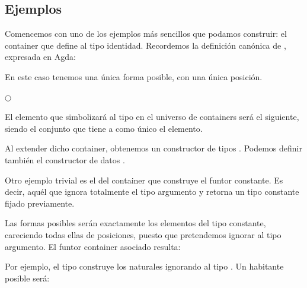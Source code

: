 \subsection{Ejemplos}


\begin{example}
  Comencemos con uno de los ejemplos más sencillos que podamos construir: el container que define al tipo identidad.
  Recordemos la definición canónica de , expresada en Agda:

  
  En este caso tenemos una única forma posible, con una única posición.

\begin{center}
$\bigcirc$
\end{center}

  El elemento que simbolizará al tipo  en el universo de containers será el siguiente, siendo \AgdaDatatype{$\top$} el conjunto que tiene a  como único el elemento.


  
  Al extender dicho container, obtenemos un constructor de tipos . Podemos definir también el constructor de datos .

\end{example}
\vspace{2ex}



\begin{example} \label{cont:k}
  Otro ejemplo trivial es el del container que construye el funtor constante. Es decir, aquél que ignora totalmente el tipo argumento y retorna un tipo constante fijado previamente.


 Las formas posibles serán exactamente los elementos del tipo constante, careciendo todas ellas de posiciones, puesto que pretendemos ignorar al tipo argumento. 
 El funtor container asociado resulta:


 Por ejemplo, el tipo  construye los naturales ignorando al tipo \AgdaDatatype{$\bot$}. Un habitante posible será:


  
\end{example}
\vspace{2ex}

